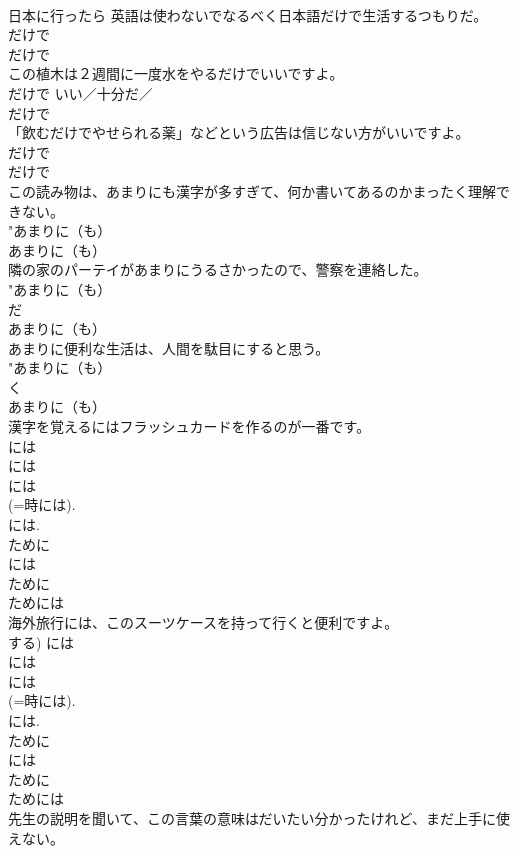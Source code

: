 \documentclass[8pt]{extreport}
\begin{document}
\begin{CJK}{UTF8}{min}
{{\\	日本に行ったら 英語は使わないでなるべく日本語だけで生活するつもりだ。	
\\	だけで 
\\	だけで 
\\	この植木は２週間に一度水をやるだけでいいですよ。	
\\	だけで {いい／十分だ／
\\	だけで 
\\	「飲むだけでやせられる薬」などという広告は信じない方がいいですよ。	
\\	だけで 
\\	だけで 
\\	この読み物は、あまりにも漢字が多すぎて、何か書いてあるのかまったく理解できない。	
\\	"あまりに（も） 
\\	あまりに（も） 
\\	隣の家のパーテイがあまりにうるさかったので、警察を連絡した。	
\\	"あまりに（も）
\\	だ} 
\\	あまりに（も） 
\\	あまりに便利な生活は、人間を駄目にすると思う。	
\\	"あまりに（も）
\\	く} 
\\	あまりに（も） 
\\	漢字を覚えるにはフラッシュカードを作るのが一番です。	
\\	には 
\\	には　
\\	には 
\\	(=時には). 
\\	には. 
\\	ために 
\\	には 
\\	ために
\\	ためには
\\	海外旅行には、このスーツケースを持って行くと便利ですよ。	
\\	する) には 
\\	には　
\\	には 
\\	(=時には). 
\\	には. 
\\	ために 
\\	には 
\\	ために
\\	ためには
\\	先生の説明を聞いて、この言葉の意味はだいたい分かったけれど、まだ上手に使えない。	
}
\end{CJK}
\end{document}
